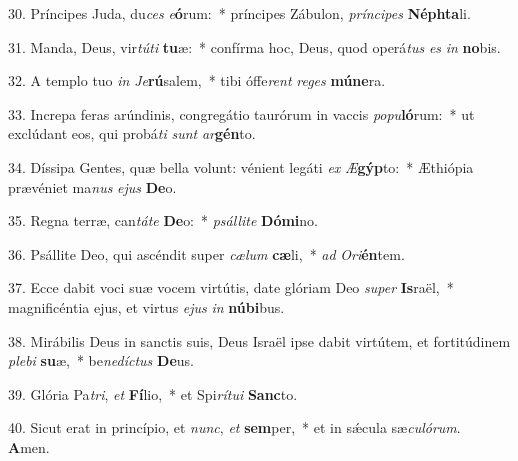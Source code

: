 30. Príncipes Juda, du\textit{ces} \textit{e}\textbf{ó}rum:~*  príncipes Zábulon, \textit{prín}\textit{ci}\textit{pes} \textbf{Néph}\textbf{ta}li.\

31. Manda, Deus, vir\textit{tú}\textit{ti} \textbf{tu}æ:~*  confírma hoc, Deus, quod operá\textit{tus} \textit{es} \textit{in} \textbf{no}bis.\

32. A templo tuo \textit{in} \textit{Je}\textbf{rú}salem,~*  tibi óffe\textit{rent} \textit{re}\textit{ges} \textbf{mú}\textbf{ne}ra.\

33. Increpa feras arúndinis, congregátio taurórum in vaccis \textit{po}\textit{pu}\textbf{ló}rum:~*  ut exclúdant eos, qui probá\textit{ti} \textit{sunt} \textit{ar}\textbf{gén}to.\

34. Díssipa Gentes, quæ bella volunt: vénient legáti \textit{ex} \textit{Æ}\textbf{gýp}to:~*  Æthiópia prævéniet ma\textit{nus} \textit{e}\textit{jus} \textbf{De}o.\

35. Regna terræ, can\textit{tá}\textit{te} \textbf{De}o:~*  \textit{psál}\textit{li}\textit{te} \textbf{Dó}\textbf{mi}no.\

36. Psállite Deo, qui ascéndit super \textit{cæ}\textit{lum} \textbf{cæ}li,~*  \textit{ad} \textit{O}\textit{ri}\textbf{én}tem.\

37. Ecce dabit voci suæ vocem virtútis, date glóriam Deo \textit{su}\textit{per} \textbf{Is}raël,~*  magnificéntia ejus, et virtus \textit{e}\textit{jus} \textit{in} \textbf{nú}\textbf{bi}bus.\

38. Mirábilis Deus in sanctis suis, Deus Israël ipse dabit virtútem, et fortitúdinem \textit{ple}\textit{bi} \textbf{su}æ,~*  be\textit{ne}\textit{díc}\textit{tus} \textbf{De}us.\

39. Glória Pa\textit{tri}, \textit{et} \textbf{Fí}lio,~*  et Spi\textit{rí}\textit{tu}\textit{i} \textbf{Sanc}to.\

40. Sicut erat in princípio, et \textit{nunc}, \textit{et} \textbf{sem}per,~*  et in sǽcula sæ\textit{cu}\textit{ló}\textit{rum}. \textbf{A}men.\

